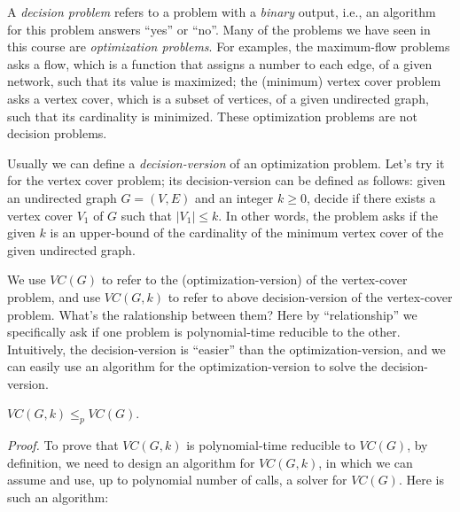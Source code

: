 
A \emph{decision problem} refers to a problem with a \emph{binary} output, i.e., an algorithm
for this problem answers ``yes'' or ``no''.
Many of the problems we have seen in this course are \emph{optimization problems}. For examples, the maximum-flow problems
asks a flow, which is a function that assigns a number to each edge, of a given network, such that its value is maximized;
the (minimum) vertex cover problem asks a vertex cover, which is a subset of vertices, of a given undirected graph, 
such that its cardinality is minimized. These optimization problems are not decision problems.

Usually we can define a \emph{decision-version} of an optimization problem. Let's try it for the vertex cover problem;
its decision-version can be defined as follows: given an undirected graph $G = (V, E)$ and an integer $k\ge 0$,
decide if there exists a vertex cover $V_1$ of $G$ such that $|V_1| \le k$. In other words, the problem asks if the
given $k$ is an upper-bound of the cardinality of the minimum vertex cover of the given undirected graph.

We use $VC(G)$ to refer to the (optimization-version) of the vertex-cover problem, and use $VC(G, k)$ to refer to
above decision-version of the vertex-cover problem. What's the ralationship between them? Here by ``relationship''
we specifically ask if one problem is polynomial-time reducible to the other. Intuitively, the decision-version
is ``easier'' than the optimization-version, and we can easily use an algorithm for the optimization-version
to solve the decision-version.
\begin{fact}
$VC(G, k)\le_p VC(G)$.
\end{fact}
\emph{Proof.} To prove that $VC(G,k)$ is polynomial-time reducible to $VC(G)$, by definition, 
we need to design an algorithm for $VC(G, k)$, in which we can assume and use, up to polynomial number of calls,
a solver for $VC(G)$. Here is such an algorithm:

\begin{algorithmblock}[0.8\textwidth]
	\xxx
	\xxx
	\xxx
	\xxx
\end{algorithmblock}

